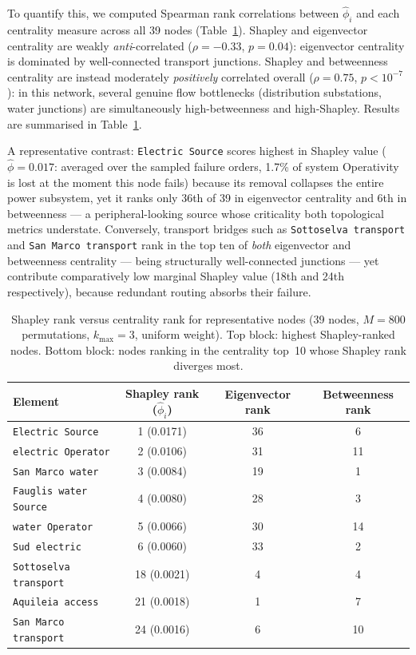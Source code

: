 \documentclass[review,12pt]{elsarticle}
\begin{document}
To quantify this, we computed Spearman rank correlations between $\hat{\phi}_i$ and each centrality measure across all 39 nodes (Table~\ref{tab:shapley_correlation}). Shapley and eigenvector centrality are weakly \emph{anti}-correlated ($\rho=-0.33$, $p=0.04$): eigenvector centrality is dominated by well-connected transport junctions. Shapley and betweenness centrality are instead moderately \emph{positively} correlated overall ($\rho=0.75$, $p<10^{-7}$): in this network, several genuine flow bottlenecks (distribution substations, water junctions) are simultaneously high-betweenness and high-Shapley.
Results are summarised in Table~\ref{tab:shapley_correlation}.

A representative contrast: \texttt{Electric Source} scores highest in Shapley value ($\hat{\phi}=0.017$: averaged over the sampled failure orders, 1.7\% of system Operativity is lost at the moment this node fails) because its removal collapses the entire power subsystem, yet it ranks only 36th of 39 in eigenvector centrality and 6th in betweenness --- a peripheral-looking source whose criticality both topological metrics understate.
Conversely, transport bridges such as \texttt{Sottoselva transport} and \texttt{San Marco transport} rank in the top ten of \emph{both} eigenvector and betweenness centrality --- being structurally well-connected junctions --- yet contribute comparatively low marginal Shapley value (18th and 24th respectively), because redundant routing absorbs their failure.

\begin{table}[H]
\centering
\caption{Shapley rank versus centrality rank for representative nodes (39 nodes, $M=800$ permutations, $k_{\max}=3$, uniform weight). Top block: highest Shapley-ranked nodes. Bottom block: nodes ranking in the centrality top~10 whose Shapley rank diverges most.}
\label{tab:shapley_correlation}
\small
\begin{tabular}{lccc}
\toprule
\textbf{Element} & \textbf{Shapley rank ($\hat{\phi}_i$)} & \textbf{Eigenvector rank} & \textbf{Betweenness rank} \\
\midrule
\texttt{Electric Source}        & 1 (0.0171) & 36 & 6 \\
\texttt{electric Operator}      & 2 (0.0106) & 31 & 11 \\
\texttt{San Marco water}        & 3 (0.0084) & 19 & 1 \\
\texttt{Fauglis water Source}   & 4 (0.0080) & 28 & 3 \\
\texttt{water Operator}         & 5 (0.0066) & 30 & 14 \\
\texttt{Sud electric}           & 6 (0.0060) & 33 & 2 \\
\midrule
\texttt{Sottoselva transport}   & 18 (0.0021) & 4 & 4 \\
\texttt{Aquileia access}        & 21 (0.0018) & 1 & 7 \\
\texttt{San Marco transport}    & 24 (0.0016) & 6 & 10 \\
\bottomrule
\end{tabular}
\end{table}
\end{document}
